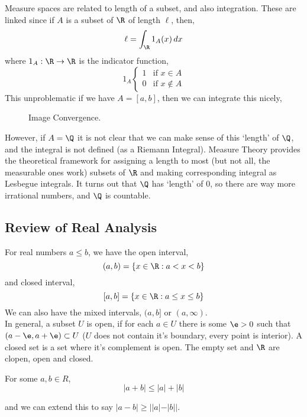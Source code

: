 \noindent
Measure spaces are related to length of a subset, and also integration. These are linked since if $A$ is a subset of $\R$ of length $\ell$, then,
$$ \ell = \int_{\R} 1_A(x)\, dx $$
where $1_A : \R \to \R$ is the indicator function,
$$ 1_A \begin{cases}
  1 & \text{if $x \in A$}\\
  0 & \text{if $x \notin A$}
\end{cases} $$
This unproblematic if we have $A = [a, b]$, then we can integrate this nicely,

\begin{wrapfigure}{r}{0.4\textwidth}
  \centering
  \resizebox{0.4\textwidth}{!}{}
  \caption{Image Convergence.}
\end{wrapfigure}

However, if $A = \Q$ it is not clear that we can make sense of this `length' of $\Q$, and the integral is not defined (as a Riemann Integral). Measure Theory provides the theoretical framework for assigning a length to most (but not all, the measurable ones work) subsets of $\R$ and making corresponding integral as Lesbegue integrals. It turns out that $\Q$ has `length' of $0$, so there are way more irrational numbers, and $\Q$ is countable.

\newpage
\subsection{Review of Real Analysis}
For real numbers $a \le b$, we have the open interval,
$$ (a, b) = \{x \in \R : a < x < b\} $$
and closed interval,
$$ [a, b] = \{x \in \R : a \le x \le b\} $$
We can also have the mixed intervals, $(a, b]$ or $(a, \infty)$. \\

\noindent
In general, a subset $U$ is open, if for each $a \in U$ there is some $\e > 0$ such that $(a- \e, a + \e) \subset U$ ($U$ does not contain it's boundary, every point is interior). A closed set is a set where it's complement is open. The empty set and $\R$ are clopen, open and closed.\\

\begin{nlemma}
  For some $a, b \in R$,
  $$ |a + b| \le |a| + |b| $$
\end{nlemma}
and we can extend this to say $|a - b| \ge ||a| - |b||$. \\


